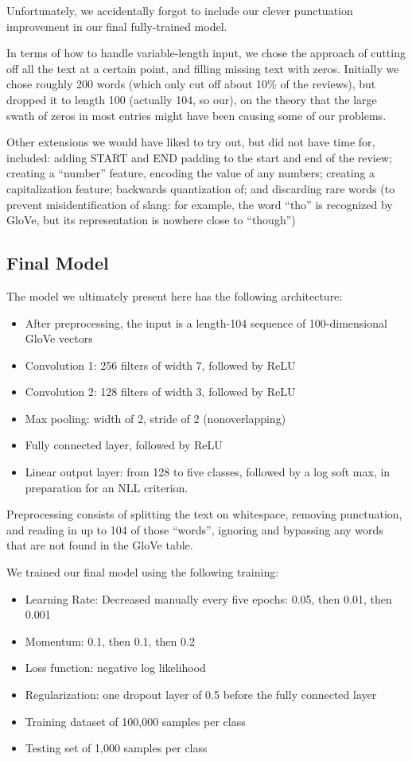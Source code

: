 \documentclass{article}
\newenvironment{itemizedense}{
\begin{itemize}
  \setlength{\itemsep}{1pt}
  \setlength{\parskip}{0pt}
  \setlength{\parsep}{0pt}
}{\end{itemize}}
\begin{document}
Unfortunately, we accidentally forgot to include our clever punctuation improvement in our final fully-trained model.

In terms of how to handle variable-length input, we chose the approach of cutting off all the text at a certain point, and filling missing text with zeros. Initially we chose roughly 200 words (which only cut off about 10\% of the reviews), but dropped it to length 100 (actually 104, so our), on the theory that the large swath of zeros in most entries might have been causing some of our problems.

Other extensions we would have liked to try out, but did not have time for, included: adding START and END padding to the start and end of the review; creating a ``number'' feature, encoding the value of any numbers; creating a capitalization feature; backwards quantization of; and discarding rare words (to prevent misidentification of slang: for example, the word ``tho'' is recognized by GloVe, but its representation is nowhere close to ``though'')

\subsection{Final Model}
\label{finalmodel}

The model we ultimately present here has the following architecture:

\begin{itemizedense}
\item After preprocessing, the input is a length-104 sequence of 100-dimensional GloVe vectors
\item Convolution 1: 256 filters of width 7, followed by ReLU
\item Convolution 2: 128 filters of width 3, followed by ReLU
\item Max pooling: width of 2, stride of 2 (nonoverlapping)
\item Fully connected layer, followed by ReLU
\item Linear output layer: from 128 to five classes, followed by a log soft max, in preparation for an NLL criterion.
\end{itemizedense}

Preprocessing consists of splitting the text on whitespace, removing punctuation, and reading in up to 104 of those ``words'', ignoring and bypassing any words that are not found in the GloVe table.

We trained our final model using the following training:
\begin{itemizedense}
\item Learning Rate: Decreased manually every five epochs: 0.05, then 0.01, then 0.001
\item Momentum: 0.1, then 0.1, then 0.2
\item Loss function: negative log likelihood
\item Regularization: one dropout layer of 0.5 before the fully connected layer
\item Training dataset of 100,000 samples per class
\item Testing set of 1,000 samples per class
\end{itemizedense}
\end{document}
